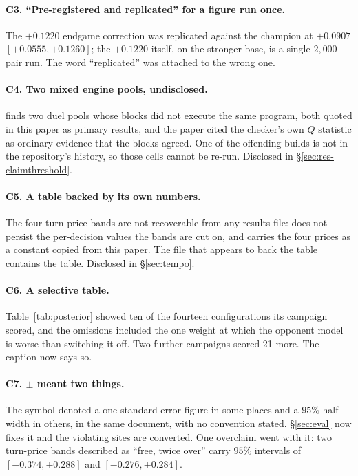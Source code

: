 \paragraph{C3. ``Pre-registered and replicated'' for a figure run once.} The
$+0.1220$ endgame correction was replicated against the champion at $+0.0907$
$[+0.0555, +0.1260]$; the $+0.1220$ itself, on the stronger base, is a single
$2{,}000$-pair run. The word ``replicated'' was attached to the wrong one.

\paragraph{C4. Two mixed engine pools, undisclosed.}
 finds two duel pools whose blocks
did not execute the same program, both quoted in this paper as primary results,
and the paper cited the checker's own $Q$ statistic as ordinary evidence that
the blocks agreed. One of the offending builds is not in the repository's
history, so those cells cannot be re-run. Disclosed in
\S\ref{sec:res-claimthreshold}.

\paragraph{C5. A table backed by its own numbers.} The four turn-price bands
are not recoverable from any results file:  does
not persist the per-decision values the bands are cut on, and
 carries the four prices as a constant copied
from this paper. The file that appears to back the table contains the table.
Disclosed in \S\ref{sec:tempo}.

\paragraph{C6. A selective table.} Table~\ref{tab:posterior} showed ten of the
fourteen configurations its campaign scored, and the omissions included the one
weight at which the opponent model is worse than switching it off. Two further
campaigns scored 21 more. The caption now says so.

\paragraph{C7. $\pm$ meant two things.} The symbol denoted a one-standard-error
figure in some places and a $95\%$ half-width in others, in the same document,
with no convention stated. \S\ref{sec:eval} now fixes it and the violating
sites are converted. One overclaim went with it: two turn-price bands described
as ``free, twice over'' carry $95\%$ intervals of $[-0.374, +0.288]$ and
$[-0.276, +0.284]$.

